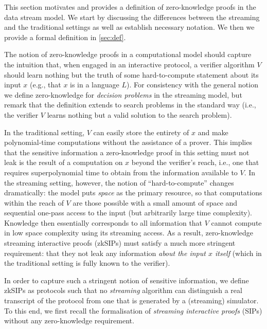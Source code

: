 \documentclass[a4paper,UKenglish,cleveref, autoref, thm-restate]{lipics-v2021}
\theoremstyle{definition}
\newcommand{\zksip}{\textrm{zkSIP}}
\begin{document}
    This section motivates and provides a definition of zero-knowledge proofs in the data stream model. We start by discussing the differences between the streaming and the traditional settings as well as establish necessary notation. We then we provide a formal definition in \cref{sec:def}.
    
    The notion of zero-knowledge proofs in a computational model should capture the intuition that, when engaged in an interactive protocol, a verifier algorithm $V$ should learn nothing but the truth of some hard-to-compute statement about its input $x$ (e.g., that $x$ is in a language $L$). For consistency with the general notion we define zero-knowledge for \emph{decision problems} in the streaming model, but remark that the definition extends to search problems in the standard way (i.e., the verifier $V$ learns nothing but a valid solution to the search problem).
    
    In the traditional setting, $V$ can easily store the entirety of $x$ and make polynomial-time computations without the assistance of a prover. This implies that the sensitive information a zero-knowledge proof in this setting must not leak is the result of a computation on $x$ beyond the verifier's reach, i.e., one that requires superpolynomial time to obtain from the information available to $V$. In the streaming setting, however, the notion of ``hard-to-compute'' changes dramatically: the model puts \emph{space} as the primary resource, so that computations within the reach of $V$ are those possible with a small amount of space and sequential one-pass access to the input (but arbitrarily large time complexity). Knowledge then essentially corresponds to all information that $V$ cannot compute in low space complexity using its streaming access. As a result, zero-knowledge streaming interactive proofs (\zksip{}s) must satisfy a much more stringent requirement: that they not leak any information \emph{about the input $x$ itself} (which in the traditional setting is fully known to the verifier).
    
    In order to capture such a stringent notion of sensitive information, we define \zksip{}s as protocols such that no \emph{streaming} algorithm can distinguish a real transcript of the protocol from one that is generated by a (streaming) simulator. To this end, we first recall the formalisation of \emph{streaming interactive proofs} (SIPs) \cite{CTY11} without any zero-knowledge requirement.
\end{document}
